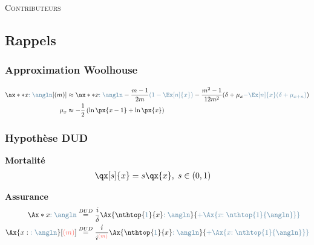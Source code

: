 \documentclass[10pt, french]{article}
\begin{document}
\begin{center}
	\textsc{\Large Contributeurs}\\[0.5cm] 
\end{center}


\newpage

\raggedcolumns
\begin{multicols*}{2} 

\subsection*{Rappels}

\subsubsection*{Approximation Woolhouse}
\begin{align*}
	\ax**{x\color{airforceblue}{:\angln}}[(m)]	
	&\approx	\ax**{x\textcolor{airforceblue}{:\angln}}	-	
		\frac{m - 1}{2m} \textcolor{airforceblue}{\left( 1 - \Ex[n]{x} \right)}	-	
		\frac{m^{2} - 1}{12m^{2}}(\delta + \mu_{x} \textcolor{airforceblue}{- \Ex[n]{x} (\delta + \mu_{x + n})})		\\
	\mu_{x}
	&\approx		-	\frac{1}{2} \left( \ln \px{x - 1} + \ln \px{x} \right)
\end{align*}	

\subsubsection*{Hypothèse DUD}
\textbf{Mortalité}
\begin{align*}
	\qx[s]{x}
	&=	s \qx{x}, \;	s\in (0, 1)
\end{align*}

\textbf{Assurance}
\begin{align*}
	\Ax*{x\textcolor{airforceblue}{:\angln}}
	&\overset{DUD}{=}	\frac{i}{\delta}\Ax{\nthtop{\textcolor{airforceblue}{1}}{x}\textcolor{airforceblue}{:\angln}}		{\color{airforceblue} + \Ax{x\textcolor{airforceblue}{:\nthtop{1}{\angln}}}}	\\
	\Ax{x:\textcolor{airforceblue}{:\angln}}[\textcolor{pastelred}{(m)}]
	&\overset{DUD}{=}	\frac{i}{i^{\textcolor{pastelred}{(m)}}}\Ax{\nthtop{\textcolor{airforceblue}{1}}{x}\textcolor{airforceblue}{:\angln}}		{\color{airforceblue} + \Ax{x\textcolor{airforceblue}{:\nthtop{1}{\angln}}}}	\\
\end{align*}


\end{multicols*}
\end{document}
